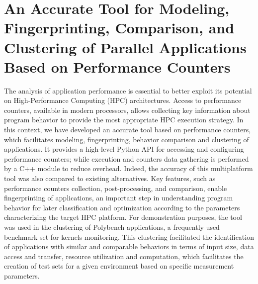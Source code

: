 
\section{An Accurate Tool for Modeling, Fingerprinting, Comparison, and Clustering of Parallel Applications Based on Performance Counters}
The analysis of application performance is essential to better exploit its potential on High-Performance Computing (HPC) architectures. Access to performance counters, available in modern processors, allows collecting key information about program behavior to provide the most appropriate HPC execution strategy.
In this context, we have developed an accurate tool based on performance counters, which facilitates modeling, fingerprinting, behavior comparison and clustering of applications.
It provides a high-level Python API for accessing and configuring performance counters; while execution and counters data gathering is  performed by a C++ module to reduce overhead. 
Indeed, the accuracy of this multiplatform tool was also compared to existing alternatives.  
Key features, such as performance counters collection, post-processing, and comparison, enable fingerprinting of applications, an important step in understanding program behavior for later classification and optimization according to the parameters characterizing the target HPC platform.
For demonstration purposes, the tool was used in the clustering of Polybench applications, a frequently used benchmark set for kernels monitoring. 
This clustering facilitated the identification of applications with similar and comparable behaviors in terms of input size, data access and transfer, resource utilization and computation, which facilitates the creation of test sets for a given environment based on specific measurement parameters.


